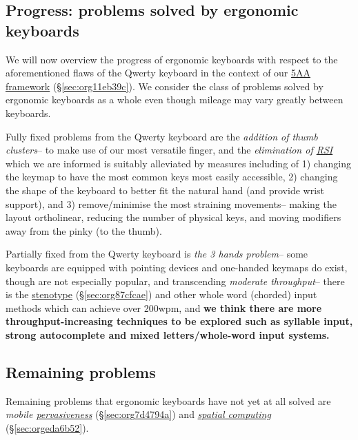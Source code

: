 \documentclass[logo,bsc,singlespacing,parskip]{infthesis}
\begin{document}
\subsection{Progress: problems solved by ergonomic keyboards}
\label{sec:org5416269}
We will now overview the progress of ergonomic keyboards with respect to the aforementioned flaws of the Qwerty keyboard in the context of our \hyperref[sec:org11eb39c]{5AA framework} (\S  \ref{sec:org11eb39c}).
We consider the class of problems solved by ergonomic keyboards as a whole even though mileage may vary greatly between keyboards.

Fully fixed problems from the Qwerty keyboard are the \emph{addition of thumb clusters}-- to make use of our most versatile finger,  and the \emph{elimination of \hyperref[orgafdb7af]{RSI}} which we are informed is suitably alleviated by measures including of 1) changing the keymap to have the most common keys most easily accessible, 2) changing the shape of the keyboard to better fit the natural hand (and provide wrist support), and 3) remove/minimise the most straining movements-- making the layout ortholinear, reducing the number of physical keys, and moving modifiers away from the pinky (to the thumb).

Partially fixed from the Qwerty keyboard is \emph{the 3 hands problem}-- some keyboards are equipped with pointing devices and one-handed keymaps do exist, though are not especially popular, and transcending \emph{moderate throughput}-- there is the  \hyperref[sec:org87cfcae]{stenotype} (\S  \ref{sec:org87cfcae}) and other whole word (chorded) input methods which can achieve over 200wpm, and \textbf{we think there are more throughput-increasing techniques to be explored such as syllable input, strong autocomplete and mixed letters/whole-word input systems.}

\subsection{Remaining problems}
\label{sec:org0e2ee8b}
Remaining problems that ergonomic keyboards have not yet at all solved are \emph{mobile \hyperref[sec:org7d4794a]{pervasiveness}} (\S  \ref{sec:org7d4794a}) and \emph{\hyperref[sec:orgeda6b52]{spatial computing}} (\S  \ref{sec:orgeda6b52}).
\end{document}

